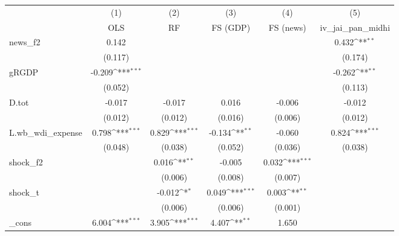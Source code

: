 {
\def\sym#1{\ifmmode^{#1}\else\(^{#1}\)\fi}
\begin{tabular}{l*{5}{c}}
\toprule
            &\multicolumn{1}{c}{(1)}&\multicolumn{1}{c}{(2)}&\multicolumn{1}{c}{(3)}&\multicolumn{1}{c}{(4)}&\multicolumn{1}{c}{(5)}\\
            &\multicolumn{1}{c}{OLS}&\multicolumn{1}{c}{RF}&\multicolumn{1}{c}{FS (GDP)}&\multicolumn{1}{c}{FS (news)}&\multicolumn{1}{c}{iv\_jai\_pan\_midhi}\\
\midrule
news\_f2     &       0.142         &                     &                     &                     &       0.432\sym{**} \\
            &     (0.117)         &                     &                     &                     &     (0.174)         \\
\addlinespace
gRGDP       &      -0.209\sym{***}&                     &                     &                     &      -0.262\sym{**} \\
            &     (0.052)         &                     &                     &                     &     (0.113)         \\
\addlinespace
D.tot       &      -0.017         &      -0.017         &       0.016         &      -0.006         &      -0.012         \\
            &     (0.012)         &     (0.012)         &     (0.016)         &     (0.006)         &     (0.012)         \\
\addlinespace
L.wb\_wdi\_expense&       0.798\sym{***}&       0.829\sym{***}&      -0.134\sym{**} &      -0.060         &       0.824\sym{***}\\
            &     (0.048)         &     (0.038)         &     (0.052)         &     (0.036)         &     (0.038)         \\
\addlinespace
shock\_f2    &                     &       0.016\sym{**} &      -0.005         &       0.032\sym{***}&                     \\
            &                     &     (0.006)         &     (0.008)         &     (0.007)         &                     \\
\addlinespace
shock\_t     &                     &      -0.012\sym{*}  &       0.049\sym{***}&       0.003\sym{**} &                     \\
            &                     &     (0.006)         &     (0.006)         &     (0.001)         &                     \\
\addlinespace
\_cons      &       6.004\sym{***}&       3.905\sym{***}&       4.407\sym{**} &       1.650         &                     \\

\end{tabular}}
